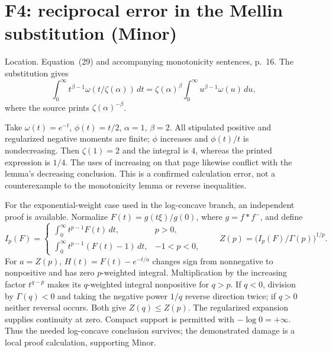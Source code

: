 \documentclass[10pt]{article}
\begin{document}
\section*{F4: reciprocal error in the Mellin substitution (Minor)}
Location. Equation (29) and accompanying monotonicity sentences, p. 16. The substitution gives \[\int_0^\infty t^{\beta-1}\omega(t/\zeta(\alpha))\,dt
 =\zeta(\alpha)^\beta\int_0^\infty u^{\beta-1}\omega(u)\,du,\] where the source prints \(\zeta(\alpha)^{-\beta}\).\par
Take \(\omega(t)=e^{-t}\), \(\phi(t)=t/2\), \(\alpha=1\), \(\beta=2\). All stipulated positive and regularized negative moments are finite; \(\phi\) increases and \(\phi(t)/t\) is nondecreasing. Then \(\zeta(1)=2\) and the integral is \(4\), whereas the printed expression is \(1/4\). The uses of increasing on that page likewise conflict with the lemma’s decreasing conclusion. This is a confirmed calculation error, not a counterexample to the monotonicity lemma or reverse inequalities.\par
For the exponential-weight case used in the log-concave branch, an independent proof is available. Normalize \(F(t)=g(t\xi)/g(0)\), where \(g=f*f^-\), and define \[I_p(F)=
 \begin{cases}\int_0^\infty t^{p-1}F(t)\,dt,&p>0,\\
 \int_0^\infty t^{p-1}(F(t)-1)\,dt,&-1<p<0,
 \end{cases}
 \qquad Z(p)=\bigl(I_p(F)/\Gamma(p)\bigr)^{1/p}.\] For \(a=Z(p)\), \(H(t)=F(t)-e^{-t/a}\) changes sign from nonnegative to nonpositive and has zero \(p\)-weighted integral. Multiplication by the increasing factor \(t^{q-p}\) makes its \(q\)-weighted integral nonpositive for \(q>p\). If \(q<0\), division by \(\Gamma(q)<0\) and taking the negative power \(1/q\) reverse direction twice; if \(q>0\) neither reversal occurs. Both give \(Z(q)\le Z(p)\). The regularized expansion supplies continuity at zero. Compact support is permitted with \(-\log0=+\infty\). Thus the needed log-concave conclusion survives; the demonstrated damage is a local proof calculation, supporting Minor.\par
\end{document}
